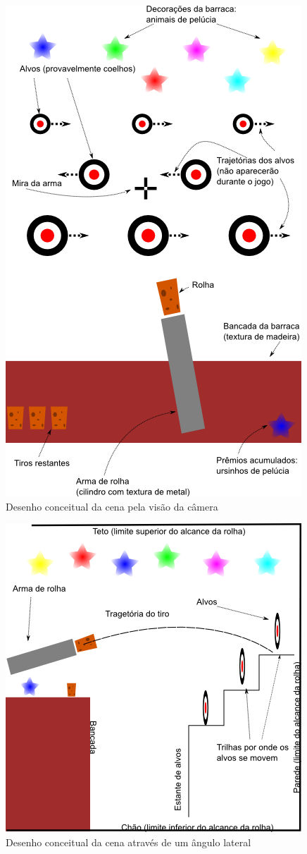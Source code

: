 \documentclass[a4paper,10pt]{article}
\begin{document}
\begin{figure}[htbp]
 \centering
  \includegraphics{barraca.png}
 \caption{Desenho conceitual da cena pela vis\~ao da c\^amera}
 \label{fig:barraca}
\end{figure}


\begin{figure}[htbp]
 \centering
  \includegraphics{lateral.png}
 \caption{Desenho conceitual da cena atrav\'es de um \^angulo lateral}
 \label{fig:lateral}
\end{figure}
\end{document}
